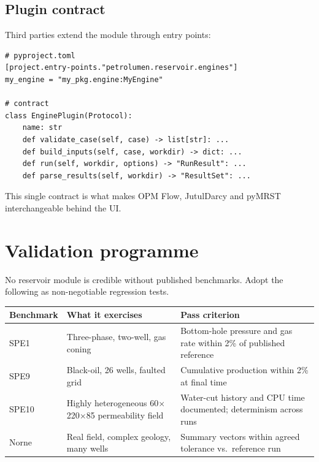 \documentclass[11pt,a4paper]{article}
\begin{document}
\subsection{Plugin contract}
Third parties extend the module through entry points:
\begin{lstlisting}[caption={Plugin interface exposed to internal and external authors.}]
# pyproject.toml
[project.entry-points."petrolumen.reservoir.engines"]
my_engine = "my_pkg.engine:MyEngine"

# contract
class EnginePlugin(Protocol):
    name: str
    def validate_case(self, case) -> list[str]: ...
    def build_inputs(self, case, workdir) -> dict: ...
    def run(self, workdir, options) -> "RunResult": ...
    def parse_results(self, workdir) -> "ResultSet": ...
\end{lstlisting}

This single contract is what makes OPM Flow, JutulDarcy and pyMRST
interchangeable behind the UI.

\section{Validation programme}

No reservoir module is credible without published benchmarks. Adopt the
following as non-negotiable regression tests.

\begin{longtable}{@{}p{2.4cm}p{5.0cm}p{6.8cm}@{}}
\toprule
\textbf{Benchmark} & \textbf{What it exercises} & \textbf{Pass criterion}\\
\midrule
\endhead
SPE1  & Three-phase, two-well, gas coning & Bottom-hole pressure and gas rate within 2\% of published reference\\
SPE9  & Black-oil, 26 wells, faulted grid & Cumulative production within 2\% at final time\\
SPE10 & Highly heterogeneous 60$\times$220$\times$85 permeability field & Water-cut history and CPU time documented; determinism across runs\\
Norne & Real field, complex geology, many wells & Summary vectors within agreed tolerance vs.\ reference run\\
\bottomrule
\end{longtable}
\end{document}
